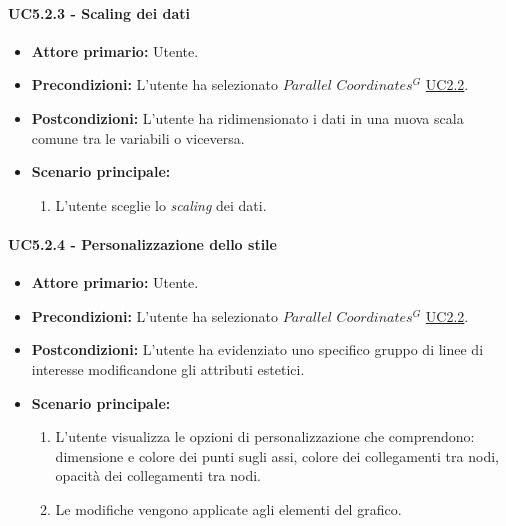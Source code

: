 \paragraph{UC5.2.3 - Scaling dei dati}
\label{sec:UC5.2.3}
    \begin{itemize}
        \item \textbf{Attore primario:} Utente.
        \item \textbf{Precondizioni:} L'utente ha selezionato $Parallel$ $Coordinates^{G}$ \hyperref[sec:UC2.2]{UC2.2}.
	    \item \textbf{Postcondizioni:} L'utente ha ridimensionato i dati in una nuova scala comune tra le variabili o viceversa.
	    \item \textbf{Scenario principale:} 
	    \begin{enumerate}
	    		\item L'utente sceglie lo \textit{scaling} dei dati.
		\end{enumerate}
    \end{itemize}

\paragraph{UC5.2.4 - Personalizzazione dello stile}
\label{sec:UC5.2.4}
    \begin{itemize}
        \item \textbf{Attore primario:} Utente.
        \item \textbf{Precondizioni:} L'utente ha selezionato $Parallel$ $Coordinates^{G}$ \hyperref[sec:UC2.2]{UC2.2}.
	    \item \textbf{Postcondizioni:} L'utente ha evidenziato uno specifico gruppo di linee di interesse modificandone gli attributi estetici.
	    \item \textbf{Scenario principale:} 
	    \begin{enumerate}
	    		\item L'utente visualizza le opzioni di personalizzazione che comprendono: dimensione e colore dei punti sugli assi, colore dei collegamenti tra nodi, opacità dei collegamenti tra nodi.
	    		\item Le modifiche vengono applicate agli elementi del grafico.
		\end{enumerate}
    \end{itemize}


